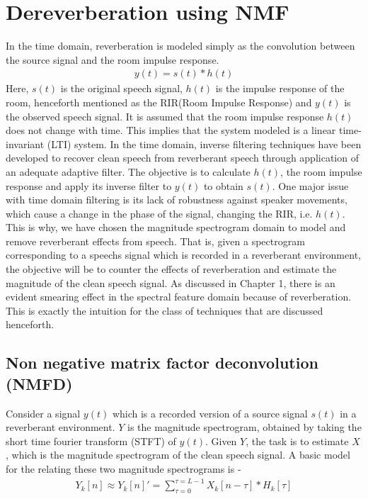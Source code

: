 
\chapter{Dereverberation using NMF}

In the time domain, reverberation is modeled simply as the convolution between the source signal and the room impulse response. 
\begin{align}
y(t) = s(t)*h(t) \label{eq :1}
\end{align}
Here, $s(t)$ is the original speech signal, $h(t)$ is the impulse response of the room, henceforth mentioned as the RIR(Room Impulse Response) and $y(t)$ is the observed speech signal. It is assumed that the room impulse response $h(t)$ does not change with time. This implies that the system modeled is a linear time-invariant (LTI) system. In the time domain, inverse filtering techniques have been developed to recover clean speech from reverberant speech through application of an adequate adaptive filter. The objective is to calculate $h(t)$, the room impulse response and apply its inverse filter to $y(t)$ to obtain $s(t)$. One major issue with time domain filtering is its lack of robustness against speaker movements, which cause a change in the phase of the signal, changing the RIR, i.e. $h(t)$. 
This is why, we have chosen the magnitude spectrogram domain to model and remove reverberant effects from speech. That is, given a spectrogram corresponding to a speechs signal which is recorded in a reverberant environment, the objective will be to counter the effects of reverberation and estimate the magnitude of the clean speech signal. As discussed in Chapter 1, there is an evident smearing effect in the spectral feature domain because of reverberation. This is exactly the intuition for the class of techniques that are discussed henceforth.




 \section{Non negative matrix factor deconvolution (NMFD)}
Consider a signal $y(t)$ which is a recorded version of a source signal $s(t)$ in a reverberant environment.  $Y$ is the magnitude spectrogram, obtained by taking the short time fourier transform (STFT) of $y(t)$. Given $Y$, the task is to estimate $X$, which is the magnitude spectrogram of the clean speech signal. A basic model for the relating these two magnitude spectrograms is \cite{naka} \cite{moham}-
\begin{align} Y_k[n] \approx Y_k[n]' = \sum_{\tau = 0}^{\tau = L-1} X_k[n - \tau] * H_k[\tau] \label{convolution}
 \end{align}
 

